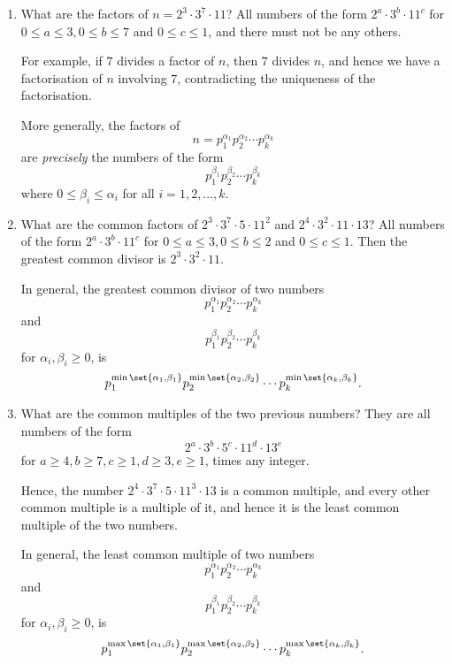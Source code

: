 \begin{examples}
    \begin{enumerate}
        \item What are the factors of \(n = 2^3 \cdot 3^7 \cdot 11\)? All numbers of the form \(2^a \cdot 3^b \cdot 11^c\) for \(0 \leq a \leq 3, 0 \leq b \leq 7\) and \(0 \leq c \leq 1\), and there must not be any others.
        
        For example, if \(7\) divides a factor of \(n\), then \(7\) divides \(n\), and hence we have a factorisation of \(n\) involving \(7\), contradicting the uniqueness of the factorisation.

        More generally, the factors of
        \[
            n = p_1^{\alpha_1} p_2^{\alpha_2} \cdots p_k^{\alpha_k}
        \]
        are \emph{precisely} the numbers of the form
        \[
            p_1^{\beta_1} p_2^{\beta_2} \cdots p_k^{\beta_k}
        \]
        where \(0 \leq \beta_i \leq \alpha_i\) for all \(i = 1, 2, \ldots, k\).

        \item What are the common factors of \(2^3 \cdot 3^7 \cdot 5 \cdot 11^2\) and \(2^4 \cdot 3^2 \cdot 11 \cdot 13\)? All numbers of the form \(2^a \cdot 3^b \cdot 11^c\) for \(0 \leq a \leq 3, 0 \leq b \leq 2\) and \(0 \leq c \leq 1\). Then the greatest common divisor is \(2^3 \cdot 3^2 \cdot 11\).
        
        In general, the greatest common divisor of two numbers
        \[
            p_1^{\alpha_1} p_2^{\alpha_2} \cdots p_k^{\alpha_k}
        \]
        and
        \[
            p_1^{\beta_1} p_2^{\beta_2} \cdots p_k^{\beta_k}
        \]
        for \(\alpha_i, \beta_i \geq 0\), is
        \[
            p_1^{\min\set{\alpha_1, \beta_1}} p_2^{\min\set{\alpha_2, \beta_2}} \cdots p_k^{\min\set{\alpha_k, \beta_k}}.
        \]

        \item What are the common multiples of the two previous numbers? They are all numbers of the form
        \[
            2^a \cdot 3^b \cdot 5^c \cdot 11^d \cdot 13^e
        \]
        for \(a \geq 4, b \geq 7, c \geq 1, d \geq 3, e \geq 1\), times any integer.

        Hence, the number \(2^4 \cdot 3^7 \cdot 5 \cdot 11^3 \cdot 13\) is a common multiple, and every other common multiple is a multiple of it, and hence it is the least common multiple of the two numbers.

        In general, the least common multiple of two numbers
        \[
            p_1^{\alpha_1} p_2^{\alpha_2} \cdots p_k^{\alpha_k}
        \]
        and
        \[
            p_1^{\beta_1} p_2^{\beta_2} \cdots p_k^{\beta_k}
        \]
        for \(\alpha_i, \beta_i \geq 0\), is
        \[
            p_1^{\max\set{\alpha_1, \beta_1}} p_2^{\max\set{\alpha_2, \beta_2}} \cdots p_k^{\max\set{\alpha_k, \beta_k}}.
        \]
    \end{enumerate}
\end{examples}

